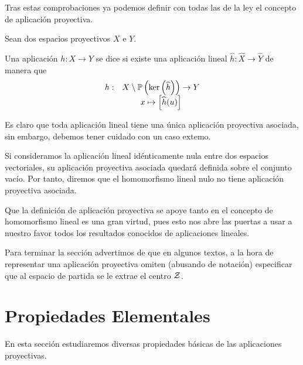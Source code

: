 Tras estas comprobaciones ya podemos definir con todas las de la ley el concepto de aplicación proyectiva.
\begin{defi}
	Sean dos espacios proyectivos $X$ e $Y$.
	
	Una aplicación $h:X\to Y$ se dice  si existe una aplicación lineal $\widehat{h}:\widehat{X}\to\widehat{Y}$ de manera que
	\[\begin{array}{cc}
	h:&X\setminus\mathbb{P}\left(\ker\left(\widehat{h}\right)\right)\to Y\\
	&x\mapsto\left [ \widehat{h}(u) \right ]
	\end{array}\]
\end{defi}
Es claro que toda aplicación lineal tiene una única aplicación proyectiva asociada, sin embargo, debemos tener cuidado con un caso extemo.
\begin{obs}
	Si consideramos la aplicación lineal idénticamente nula entre dos espacios vectoriales, su aplicación proyectiva asociada quedará definida sobre el conjunto vacío. Por tanto, diremos que el homomorfismo lineal nulo no tiene aplicación proyectiva asociada.
\end{obs}
Que la definición de aplicación proyectiva se apoye tanto en el concepto de homomorfismo lineal es una gran virtud, pues esto nos abre las puertas a usar a nuestro favor todos los resultados conocidos de aplicaciones lineales.

Para terminar la sección advertimos de que en algunos textos, a la hora de representar una aplicación proyectiva omiten (abusando de notación) especificar que al espacio de partida se le extrae el centro $\mathcal{Z}$. 
\section{Propiedades Elementales}
\label{C4_propiedadesElementales}
En esta sección estudiaremos diversas propiedades básicas de las aplicaciones proyectivas.

